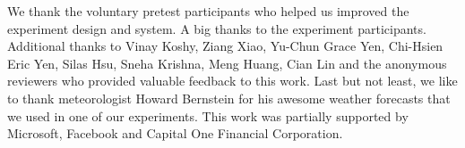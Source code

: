 \begin{acks}
We thank the voluntary pretest participants who helped us improved the experiment design and system. A big thanks to the experiment participants. Additional thanks to Vinay Koshy, Ziang Xiao, Yu-Chun Grace Yen, Chi-Hsien Eric Yen, Silas Hsu, Sneha Krishna, Meng Huang, Cian Lin and the anonymous reviewers who provided valuable feedback to this work. Last but not least, we like to thank meteorologist Howard Bernstein for his awesome weather forecasts that we used in one of our experiments. This work was partially supported by Microsoft, Facebook and Capital One Financial Corporation. 
\end{acks}



